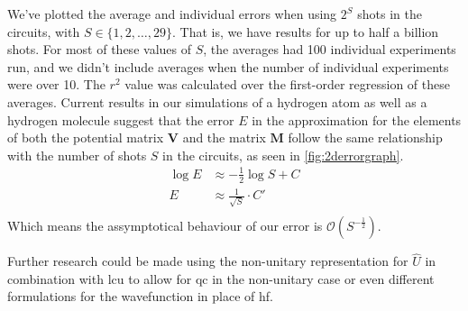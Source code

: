 \documentclass{aux/ttuthes2007}
\begin{document}
We've plotted the average and individual errors when using $2^S$ shots in the circuits, with $S \in \{1, 2, \ldots, 29\}$. That is, we have results for up to half a billion shots. For most of these values of $S$, the averages had 100 individual experiments run, and we didn't include averages when the number of individual experiments were over 10. The $r^2$ value was calculated over the first-order regression of these averages.
Current results in our simulations of a hydrogen atom as well as a hydrogen molecule suggest that the error $E$ in the approximation for the elements of both the potential matrix $\bm V$ and the matrix $\bm M$ follow the same relationship with the number of shots $S$ in the circuits, as seen in \ref{fig:2derrorgraph}. 
%
\begin{equation*}
	\begin{split}
		\log E &\approx -\frac 1 2 \log S + C \\
		E &\approx \frac 1 {\sqrt{S}} \cdot C' \\
	\end{split}
\end{equation*}
%
Which means the assymptotical behaviour of our error is $\mathcal O(S^{-\frac 1 2})$.

Further research could be made using the non-unitary representation for $\hat U$ in combination with \gls{lcu} to allow for \gls{qc} in the non-unitary case or even different formulations for the wavefunction in place of \gls{hf}.


\backmatter





\glsaddall

\printnoidxglossary[type=acronym,sort=letter]
\end{document}
